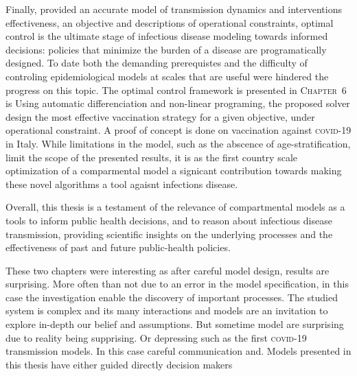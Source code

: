 Finally, provided an accurate model of transmission dynamics and interventions effectiveness, an objective and descriptions of operational constraints, optimal control is the ultimate stage of infectious disease modeling towards informed decisions: policies that minimize the burden of a disease are programatically designed. To date both the demanding prerequistes and the difficulty of controling epidemiological models at scales that are useful were hindered the progress on this topic. The optimal control framework is presented in \textsc{Chapter~6} is  Using automatic differenciation and non-linear programing, the proposed solver design the most effective vaccination strategy for a given objective, under operational constraint. A proof of concept is done on vaccination against \textsc{covid}-19 in Italy. While limitations in the model, such as the abscence of age-stratification, limit the scope of the presented results, it is as the first country scale optimization of a comparmental model  a signicant contribution towards making these novel algorithms a tool agaisnt infections disease.



Overall, this thesis is a testament of the relevance of compartmental models as a tools to inform public health decisions, and to reason about infectious disease transmission, providing scientific insights on the underlying processes and the effectiveness of past and future public-health policies. %

  These two chapters were interesting as after careful model design, results are surprising. More often than not due to an error in the model specification, in this case the investigation enable the discovery of important processes. The studied system is complex and its many interactions and models are an invitation to explore in-depth our belief and assumptions. But sometime model are surprising due to reality being supprising. Or depressing such as the first \textsc{covid}-19 transmission models. 
   In this case careful communication and. Models presented in this thesis have either guided directly decision makers



